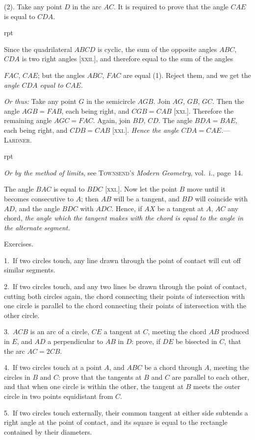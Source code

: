 \documentclass[oneside]{book}
\newcounter{wrapwidth}
\newcommand\exhead[1]{
\Needspace*{5\baselineskip}\begin{center}
\textsf{#1}
\end{center}
}
\newcommand\imgflow[3]{
\setcounter{wrapwidth}{#1}

\begin{wrapfigure}[#2]{r}{\value{wrapwidth}pt}
\begin{center}
\vspace{-0.3in}

\end{center}
\end{wrapfigure}
}
\begin{document}
(2). Take any point $D$ in the arc $AC$. It is required
to prove that the angle $CAE$ is equal to $CDA$.


\imgflow{130}{12}{f139}

Since the quadrilateral $ABCD$ is cyclic, the sum of
the opposite angles $ABC$, $CDA$ is two right angles
[\textsc{xxii.}], and therefore equal to the sum of the angles

$FAC$, $CAE$; but the angles $ABC$, $FAC$ are equal (1).
Reject them, and we get the \emph{angle $CDA$ equal to
$CAE$.}

\emph{Or thus:} Take any point
$G$ in the semicircle $AGB$.
Join $AG$, $GB$, $GC$. Then the
angle $AGB = FAB$, each being
right, and $CGB = CAB$ [\textsc{xxi.}].
Therefore the remaining angle
$AGC = FAC$. Again, join $BD$,
$CD$. The angle $BDA = BAE$,
each being right, and $CDB
= CAB$ [\textsc{xxi.}]. \emph{Hence the angle
$CDA = CAE$.}---\textsc{Lardner}.


\imgflow{120}{9}{f140}

\textit{Or by the method of limits}, see \textsc{Townsend's} \emph{Modern
Geometry}, vol.~i., page~14.

The angle $BAC$ is equal to
$BDC$ [\textsc{xxi.}]. Now let the point
$B$ move until it becomes consecutive
to $A$; then $AB$ will be
a tangent, and $BD$ will coincide
with $AD$, and the angle $BDC$
with $ADC$. Hence, if $AX$ be
a tangent at $A$, $AC$ any chord,
\emph{the angle which the tangent makes with the chord is equal
to the angle in the alternate segment.}

\exhead{Exercises.}

\begin{footnotesize}
1.~If two circles touch, any line drawn through the point of
contact will cut off similar segments.

2.~If two circles touch, and any two lines be drawn through the
point of contact, cutting both circles again, the chord connecting
their points of intersection with one circle is parallel to the chord
connecting their points of intersection with the other circle.

3.~$ACB$ is an arc of a circle, $CE$ a tangent at $C$, meeting the
chord $AB$ produced in $E$, and $AD$ a perpendicular to $AB$ in $D$:
prove, if $DE$ be bisected in $C$, that the arc $AC = 2CB$.

4.~If two circles touch at a point $A$, and $ABC$ be a chord
through $A$, meeting the circles in $B$ and $C$: prove that the tangents
at $B$ and $C$ are parallel to each other, and that when one
circle is within the other, the tangent at $B$ meets the outer circle
in two points equidistant from $C$.


5.~If two circles touch externally, their common tangent at
either side subtends a right angle at the point of contact, and its
square is equal to the rectangle contained by their diameters.
\par\end{footnotesize}
\end{document}
